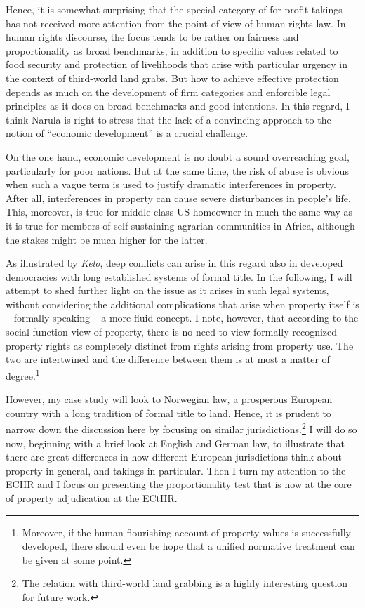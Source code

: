 \documentclass[12pt,a4paper]{book} %
\begin{document}
Hence, it is somewhat surprising that the special category of for-profit takings has not received more attention from the point of view of human rights law. In human rights discourse, the focus tends to be rather on fairness and proportionality as broad benchmarks, in addition to specific values related to food security and protection of livelihoods that arise with particular urgency in the context of third-world land grabs. But how to achieve effective protection depends as much on the development of firm categories and enforcible legal principles as it does on broad benchmarks and good intentions. In this regard, I think Narula is right to stress that the lack of a convincing approach to the notion of ``economic development'' is a crucial challenge.

On the one hand, economic development is no doubt a sound overreaching goal, particularly for poor nations. But at the same time, the risk of abuse is obvious when such a vague term is used to justify dramatic interferences in property. After all, interferences in property can cause severe disturbances in people's life. This, moreover, is true for middle-class US homeowner in much the same way as it is true for members of self-sustaining agrarian communities in Africa, although the stakes might be much higher for the latter.

As illustrated by {\it Kelo}, deep conflicts can arise in this regard also in developed democracies with long established systems of formal title. In the following, I will attempt to shed further light on the issue as it arises in such legal systems, without considering the additional complications that arise when property itself is -- formally speaking -- a more fluid concept. I note, however, that according to the social function view of property, there is no need to view formally recognized property rights as completely distinct from rights arising from property use. The two are intertwined and the difference between them is at most a matter of degree.\footnote{Moreover, if the human flourishing account of property values is successfully developed, there should even be hope that a unified normative treatment can be given at some point.}

However, my case study will look to Norwegian law, a prosperous European country with a long tradition of formal title to land. Hence, it is prudent to narrow down the discussion here by focusing on similar jurisdictions.\footnote{The relation with third-world land grabbing is a highly interesting question for future work.} I will do so now, beginning with a brief look at English and German law, to illustrate that there are great differences in how different European jurisdictions think about property in general, and takings in particular. Then I turn my attention to the ECHR and I focus on presenting the proportionality test that is now at the core of property adjudication at the ECtHR.
\end{document}

